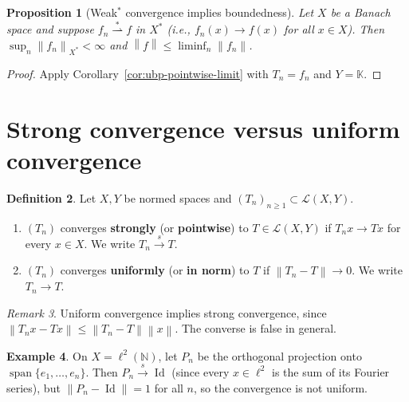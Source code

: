 \documentclass[a4paper,12pt]{book}
\DeclareMathOperator{\Id}{Id}
\DeclareMathOperator{\spn}{span}
\newcommand{\N}{\mathbb{N}}
\newcommand{\K}{\mathbb{K}}
\newcommand{\norm}[1]{\left\| #1 \right\|}
\newcommand{\weakstarto}{\overset{*}{\rightharpoonup}}
\theoremstyle{definition}
\newtheorem{definition}{Definition}[chapter]
\newtheorem{example}[definition]{Example}
\theoremstyle{plain}
\newtheorem{proposition}[definition]{Proposition}
\theoremstyle{remark}
\newtheorem{remark}[definition]{Remark}
\begin{document}
\begin{proposition}[Weak$^*$ convergence implies boundedness]%
\label{prop:weakstar-conv-bounded}
Let $X$ be a Banach space and suppose $f_n \weakstarto f$ in $X^*$ (i.e.,
$f_n(x) \to f(x)$ for all $x \in X$). Then $\sup_n \norm{f_n}_{X^*} < \infty$
and $\norm{f} \leq \liminf_n \norm{f_n}$.
\end{proposition}

\begin{proof}
Apply Corollary~\ref{cor:ubp-pointwise-limit} with $T_n = f_n$ and $Y = \K$.
\end{proof}

\section{Strong convergence versus uniform convergence}%
\label{sec:strong-vs-uniform}

\begin{definition}\label{def:strong-uniform-convergence}
Let $X,Y$ be normed spaces and $(T_n)_{n \geq 1} \subset \mathcal{L}(X,Y)$.
\begin{enumerate}[label=(\roman*)]
  \item $(T_n)$ converges \textbf{strongly} (or \textbf{pointwise}) to
    $T \in \mathcal{L}(X,Y)$ if $T_n x \to Tx$ for every $x \in X$.
    We write $T_n \xrightarrow{s} T$.
  \item $(T_n)$ converges \textbf{uniformly} (or \textbf{in norm}) to $T$ if
    $\norm{T_n - T} \to 0$. We write $T_n \to T$.
\end{enumerate}
\end{definition}

\begin{remark}\label{rem:uniform-implies-strong}
Uniform convergence implies strong convergence, since
$\norm{T_n x - Tx} \leq \norm{T_n - T}\norm{x}$. The converse is false in general.
\end{remark}

\begin{example}\label{ex:strong-not-uniform}
On $X = \ell^2(\N)$, let $P_n$ be the orthogonal projection onto
$\spn\{e_1, \ldots, e_n\}$. Then $P_n \xrightarrow{s} \Id$ (since every $x \in
\ell^2$ is the sum of its Fourier series), but $\norm{P_n - \Id} = 1$ for all $n$,
so the convergence is not uniform.
\end{example}
\end{document}
